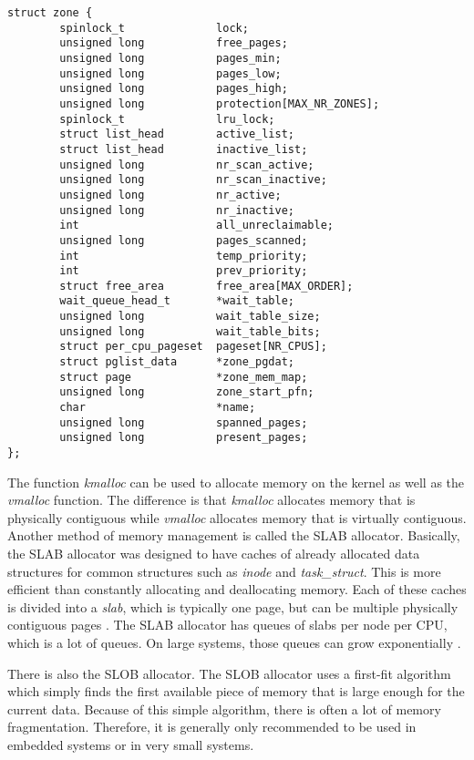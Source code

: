 \documentclass[10pt,draftclsnofoot,onecolumn,journal,compsoc]{IEEEtran}
\begin{document}
\begin{lstlisting}[caption={The \textit{zone} structure in the linux/mmzone.h file.}]
struct zone {
        spinlock_t              lock;
        unsigned long           free_pages;
        unsigned long           pages_min;
        unsigned long           pages_low;
        unsigned long           pages_high;
        unsigned long           protection[MAX_NR_ZONES];
        spinlock_t              lru_lock;
        struct list_head        active_list;
        struct list_head        inactive_list;
        unsigned long           nr_scan_active;
        unsigned long           nr_scan_inactive;
        unsigned long           nr_active;
        unsigned long           nr_inactive;
        int                     all_unreclaimable;
        unsigned long           pages_scanned;
        int                     temp_priority;
        int                     prev_priority;
        struct free_area        free_area[MAX_ORDER];
        wait_queue_head_t       *wait_table;
        unsigned long           wait_table_size;
        unsigned long           wait_table_bits;
        struct per_cpu_pageset  pageset[NR_CPUS];
        struct pglist_data      *zone_pgdat;
        struct page             *zone_mem_map;
        unsigned long           zone_start_pfn;
        char                    *name;
        unsigned long           spanned_pages;
        unsigned long           present_pages;
};
\end{lstlisting}
The function \textit{kmalloc} can be used to allocate memory on the kernel as well as the \textit{vmalloc} function. The difference is that \textit{kmalloc} allocates memory that is physically contiguous while \textit{vmalloc} allocates memory that is virtually contiguous. Another method of memory management is called the SLAB allocator. Basically, the SLAB allocator was designed to have caches of already allocated data structures for common structures such as \textit{inode} and \textit{task\_struct}. This is more efficient than constantly allocating and deallocating memory. Each of these caches is divided into a \textit{slab}, which is typically one page, but can be multiple physically contiguous pages \cite{linux}. The SLAB allocator has queues of slabs per node per CPU, which is a lot of queues. On large systems, those queues can grow exponentially \cite{slub}.  

There is also the SLOB allocator. The SLOB allocator uses a first-fit algorithm which simply finds the first available piece of memory that is large enough for the current data. Because of this simple algorithm, there is often a lot of memory fragmentation. Therefore, it is generally only recommended to be used in embedded systems or in very small systems. 
\end{document}

